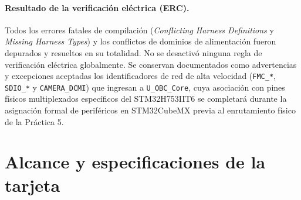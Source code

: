 \documentclass[11pt,a4paper]{article}
\begin{document}
\paragraph{Resultado de la verificación eléctrica (ERC).} Todos los errores fatales de compilación (\emph{Conflicting Harness Definitions} y \emph{Missing Harness Types}) y los conflictos de dominios de alimentación fueron depurados y resueltos en su totalidad. No se desactivó ninguna regla de verificación eléctrica globalmente. Se conservan documentados como advertencias y excepciones aceptadas los identificadores de red de alta velocidad (\texttt{FMC\_*}, \texttt{SDIO\_*} y \texttt{CAMERA\_DCMI}) que ingresan a \texttt{U\_OBC\_Core}, cuya asociación con pines físicos multiplexados específicos del STM32H753IIT6 se completará durante la asignación formal de periféricos en STM32CubeMX previa al enrutamiento físico de la Práctica 5.

\section{Alcance y especificaciones de la tarjeta}
\end{document}
